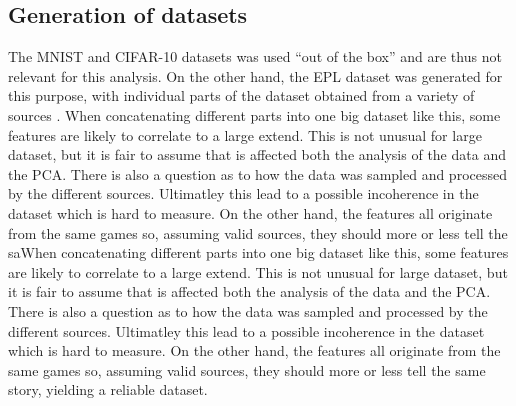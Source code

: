 \subsection{Generation of datasets}
	The MNIST and CIFAR-10 datasets was used ``out of the box'' and are thus not relevant for this analysis. On the other hand, the EPL dataset was generated for this purpose, with individual parts of the dataset obtained from a variety of sources . When concatenating different parts into one big dataset like this, some features are likely to correlate to a large extend. This is not unusual for large dataset, but it is fair to assume that is affected both the analysis of the data and the PCA. There is also a question as to how the data was sampled and processed by the different sources. Ultimatley this lead to a possible incoherence in the dataset which is hard to measure. On the other hand, the features all originate from the same games so, assuming valid sources, they should more or less tell the saWhen concatenating different parts into one big dataset like this, some features are likely to correlate to a large extend. This is not unusual for large dataset, but it is fair to assume that is affected both the analysis of the data and the PCA. There is also a question as to how the data was sampled and processed by the different sources. Ultimatley this lead to a possible incoherence in the dataset which is hard to measure. On the other hand, the features all originate from the same games so, assuming valid sources, they should more or less tell the same story, yielding a reliable dataset.  
